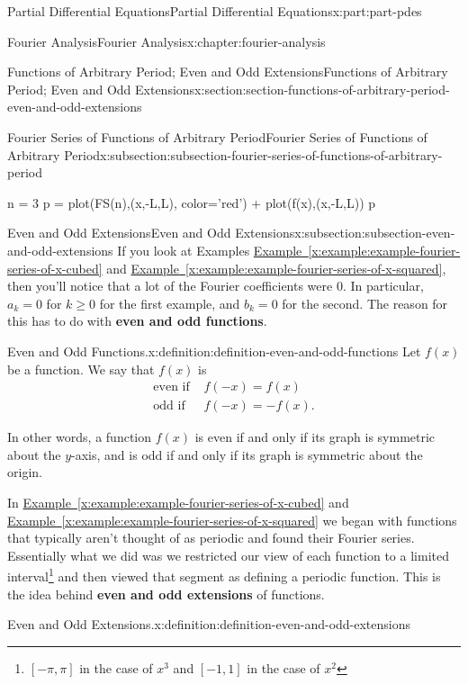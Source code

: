 \documentclass[twoside,10pt,]{book}
\newcommand{\xreffont}{\relax}
\newcommand{\terminology}[1]{\textbf{#1}}
\numberwithin{equation}{part}
\newcommand{\amp}{&}
\begin{document}
\begin{partptx}{Partial Differential Equations}{}{Partial Differential Equations}{}{}{x:part:part-pdes}
\begin{chapterptx}{Fourier Analysis}{}{Fourier Analysis}{}{}{x:chapter:fourier-analysis}
\begin{sectionptx}{Functions of Arbitrary Period; Even and Odd Extensions}{}{Functions of Arbitrary Period; Even and Odd Extensions}{}{}{x:section:section-functions-of-arbitrary-period-even-and-odd-extensions}
\begin{subsectionptx}{Fourier Series of Functions of Arbitrary Period}{}{Fourier Series of Functions of Arbitrary Period}{}{}{x:subsection:subsection-fourier-series-of-functions-of-arbitrary-period}
\begin{sageinput}
n = 3
p = plot(FS(n),(x,-L,L), color='red') + plot(f(x),(x,-L,L))
p
\end{sageinput}
\end{subsectionptx}
%
%
\typeout{************************************************}
\typeout{************************************************}
%
\begin{subsectionptx}{Even and Odd Extensions}{}{Even and Odd Extensions}{}{}{x:subsection:subsection-even-and-odd-extensions}
If you look at Examples \hyperref[x:example:example-fourier-series-of-x-cubed]{Example~{\xreffont\ref{x:example:example-fourier-series-of-x-cubed}}} and \hyperref[x:example:example-fourier-series-of-x-squared]{Example~{\xreffont\ref{x:example:example-fourier-series-of-x-squared}}}, then you'll notice that a lot of the Fourier coefficients were \(0\). In particular, \(a_{k} = 0\) for \(k\geq0\) for the first example, and \(b_{k}=0\) for the second. The reason for this has to do with \terminology{even and odd functions}.%
\begin{definition}{Even and Odd Functions.}{x:definition:definition-even-and-odd-functions}%
%
Let \(f(x)\) be a function. We say that \(f(x)\) is%
\begin{align*}
\text{even if } \amp f(-x) = f(x)\\
\text{odd if } \amp f(-x) = -f(x).
\end{align*}
%
\end{definition}
In other words, a function \(f(x)\) is even if and only if its graph is symmetric about the \(y\)-axis, and is odd if and only if its graph is symmetric about the origin.%
\par
In \hyperref[x:example:example-fourier-series-of-x-cubed]{Example~{\xreffont\ref{x:example:example-fourier-series-of-x-cubed}}} and \hyperref[x:example:example-fourier-series-of-x-squared]{Example~{\xreffont\ref{x:example:example-fourier-series-of-x-squared}}} we began with functions that typically aren't thought of as periodic and found their Fourier series. Essentially what we did was we restricted our view of each function to a limited interval\footnote{\([-\pi,\pi]\) in the case of \(x^{3}\) and \([-1,1]\) in the case of \(x^{2}\)\label{x:fn:footnote-periodic-extensions}} and then viewed that segment as defining a periodic function. This is the idea behind \terminology{even and odd extensions} of functions.%
\begin{definition}{Even and Odd Extensions.}{x:definition:definition-even-and-odd-extensions}%

\end{definition}
\end{subsectionptx}
\end{sectionptx}
\end{chapterptx}
\end{partptx}
\end{document}
